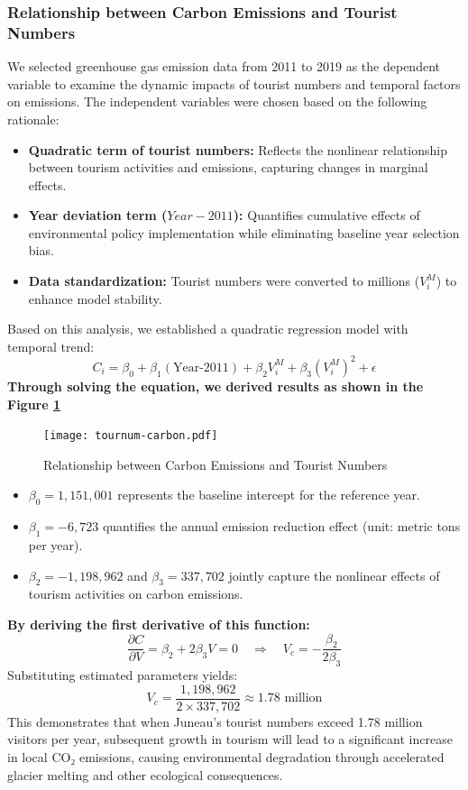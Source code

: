\documentclass{mcmthesis}
\begin{document}
\subsubsection{Relationship between Carbon Emissions and Tourist Numbers}
We selected greenhouse gas emission data from 2011 to 2019 as the dependent variable to examine the dynamic impacts of tourist numbers and temporal factors on emissions. The independent variables were chosen based on the following rationale:
\begin{itemize}
  \item \textbf{Quadratic term of tourist numbers:} Reflects the nonlinear relationship between tourism activities and emissions, capturing changes in marginal effects.
  \item \textbf{Year deviation term ($Year-2011$):} Quantifies cumulative effects of environmental policy implementation while eliminating baseline year selection bias.
  \item \textbf{Data standardization:} Tourist numbers were converted to millions ($V_i^M$) to enhance model stability.
\end{itemize}
Based on this analysis, we established a quadratic regression model with temporal trend:
\begin{equation}
  C_i = \beta_0 + \beta_1 (\text{Year-2011}) + \beta_2 V_i^M + \beta_3 \left( V_i^M \right)^2 + \epsilon 
\end{equation}
\textbf{Through solving the equation, we derived results as shown in the Figure \ref{fig:carbon}}
\begin{figure}[h!]
  \centering
  \texttt{[image: tournum-carbon.pdf]}
  \caption{Relationship between Carbon Emissions and Tourist Numbers}  %
  \label{fig:carbon}                   %
\end{figure}
\begin{itemize}
  \item $\beta_0 = 1,151,001$ represents the baseline intercept for the reference year.
  \item $\beta_1 = −6,723$ quantifies the annual emission reduction effect (unit: metric tons per year).
  \item $\beta_2 = −1,198,962$ and $\beta_3 = 337,702$ jointly capture the nonlinear effects of tourism activities on carbon emissions.
\end{itemize}
\textbf{By deriving the first derivative of this function:}
\begin{equation}
  \frac{\partial C}{\partial V} = \beta_2 + 2\beta_3 V = 0 \quad \Rightarrow \quad V_c = -\frac{\beta_2}{2\beta_3}
\end{equation}
Substituting estimated parameters yields:
\begin{equation}
  V_c = \frac{1,198,962}{2 \times 337,702} \approx 1.78 \text{ million}
\end{equation}
This demonstrates that when Juneau's tourist numbers exceed 1.78 million visitors per year, subsequent growth in tourism will lead to a significant increase in local CO₂ emissions, causing environmental degradation through accelerated glacier melting and other ecological consequences.
\end{document}
